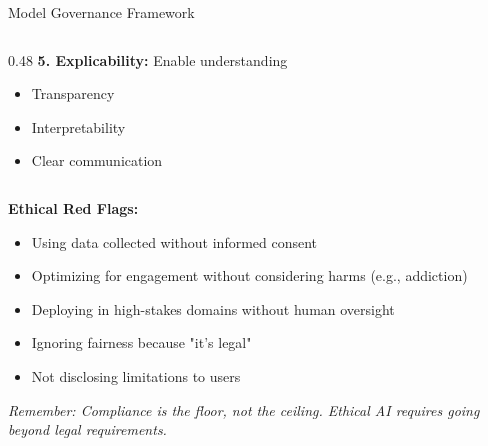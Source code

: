 \begin{frame}{Model Governance Framework}
\begin{columns}
\begin{column}{0.48\textwidth}
\vspace{0.2cm}
\textbf{5. Explicability:} Enable understanding
\begin{itemize}
\item Transparency
\item Interpretability
\item Clear communication
\end{itemize}
\end{column}
\end{columns}

\vspace{0.3cm}
\textbf{Ethical Red Flags:}
\begin{itemize}
\item Using data collected without informed consent
\item Optimizing for engagement without considering harms (e.g., addiction)
\item Deploying in high-stakes domains without human oversight
\item Ignoring fairness because "it's legal"
\item Not disclosing limitations to users
\end{itemize}

\vspace{0.2cm}
\textit{Remember: Compliance is the floor, not the ceiling. Ethical AI requires going beyond legal requirements.}
\end{frame}

